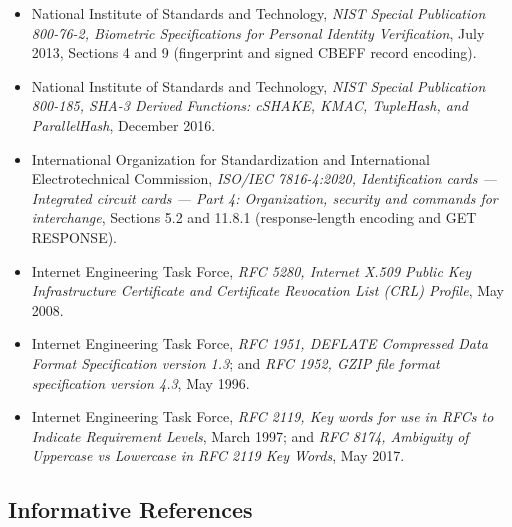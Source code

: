 \begin{itemize}
  \item National Institute of Standards and Technology, \emph{NIST Special Publication 800-76-2, Biometric Specifications for Personal Identity Verification}, July 2013, Sections 4 and 9 (fingerprint and signed CBEFF record encoding).
  \item National Institute of Standards and Technology, \emph{NIST Special Publication 800-185, SHA-3 Derived Functions: cSHAKE, KMAC, TupleHash, and ParallelHash}, December 2016.
  \item International Organization for Standardization and International Electrotechnical Commission, \emph{ISO/IEC 7816-4:2020, Identification cards — Integrated circuit cards — Part 4: Organization, security and commands for interchange}, Sections 5.2 and 11.8.1 (response-length encoding and GET RESPONSE).
  \item Internet Engineering Task Force, \emph{RFC 5280, Internet X.509 Public Key Infrastructure Certificate and Certificate Revocation List (CRL) Profile}, May 2008.
  \item Internet Engineering Task Force, \emph{RFC 1951, DEFLATE Compressed Data Format Specification version 1.3}; and \emph{RFC 1952, GZIP file format specification version 4.3}, May 1996.
  \item Internet Engineering Task Force, \emph{RFC 2119, Key words for use in RFCs to Indicate Requirement Levels}, March 1997; and \emph{RFC 8174, Ambiguity of Uppercase vs Lowercase in RFC 2119 Key Words}, May 2017.
\end{itemize}

\subsection{Informative References}

